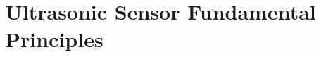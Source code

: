 \graphicspath{{content/1_literatureReview/figures/}}
\section{Ultrasonic Sensor Fundamental Principles}\label{sec:ultrasonicSensorFundamentals}
